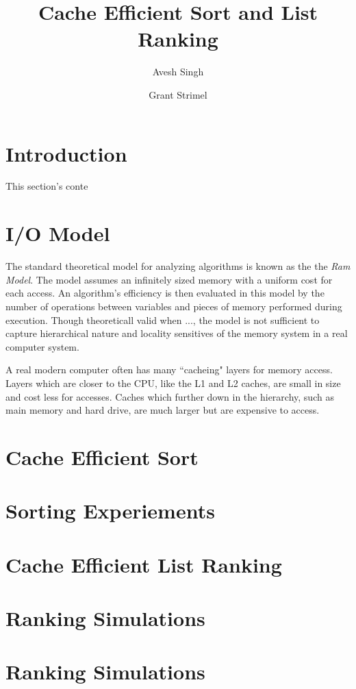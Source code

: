 \documentclass[11pt]{article}
\begin{document}
\title{\Large \bf Cache Efficient Sort and List Ranking}
\author{Avesh Singh \and Grant Strimel}

\maketitle
\section{Introduction}
This section's conte


\section{I/O Model}
The standard theoretical model for analyzing algorithms is known as the the \textit{Ram Model}.
The model assumes an infinitely sized memory with a uniform cost for each access.  An algorithm's efficiency is then 
evaluated in this model by the number of operations between variables and pieces of memory performed during execution. 
Though theoreticall valid when ..., the model is not sufficient to capture hierarchical nature and locality sensitives of the memory 
system in a real computer system.

A real modern computer often has many ``cacheing" layers for memory access.  Layers which are closer to the CPU, 
like the L1 and L2 caches, are small in size and cost less for accesses. Caches which further down in the hierarchy, such as 
main memory and hard drive, are much larger but are expensive to access.


\section{Cache Efficient Sort}

\section{Sorting Experiements}

\section{Cache Efficient List Ranking}

\section{Ranking Simulations}

\section{Ranking Simulations}
\end{document}
